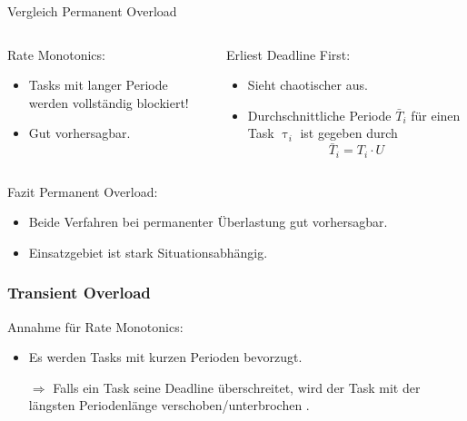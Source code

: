 \begin{frame}{Vergleich Permanent Overload}
	\begin{columns}[]
  			\begin{column}{0.5\textwidth}
				Rate Monotonics:
				\begin{itemize}
					\item Tasks mit langer Periode werden vollständig blockiert!
					\item Gut vorhersagbar.
				\end{itemize}

			\end{column}
  			\begin{column}{0.5\textwidth}
  				Erliest Deadline First:
				\begin{itemize}
					\item Sieht chaotischer aus.
					\item Durchschnittliche Periode $\bar{T}_i$ für einen Task $\uptau_i$ ist gegeben durch
						\begin{equation}
							\bar{T}_i=T_i\cdot U
						\end{equation}
				\end{itemize}	
  			\end{column}
	\end{columns}
\end{frame}


\begin{frame}{Fazit Permanent Overload:}
	
	\begin{itemize}
		\item Beide Verfahren bei permanenter Überlastung gut vorhersagbar.
		\item Einsatzgebiet ist stark Situationsabhängig.
	\end{itemize}
\end{frame}

\subsubsection{Transient Overload}
\begin{frame}{Annahme für Rate Monotonics:}
	\begin{itemize}
		\item Es werden Tasks mit kurzen Perioden bevorzugt.\pause
		\item[$\Rightarrow$] Falls ein Task seine Deadline überschreitet, wird der Task mit der längsten Periodenlänge verschoben/unterbrochen	.
	\end{itemize}
\end{frame}

